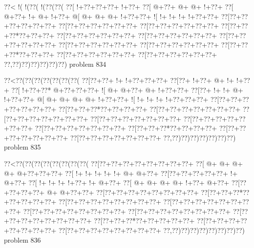 \vbox{\vbox{\goo
\0??<\- !(\- !(\0??(\- !(\0??(\0??(
\0??[\- !+\0??+\0??+\0??+\- !+\0??+
\0??[\- @+\0??+\- @+\- @+\- !+\0??+
\0??[\- @+\0??+\- !+\- @+\- !+\0??+
\- @[\- @+\- @+\- @+\- !+\0??+\0??+
\- ![\- !+\- !+\- !+\- !+\0??+\0??+
\0??[\0??+\0??+\0??+\0??+\0??+\0??+
\0??[\0??+\0??+\0??+\0??+\0??+\0??+
\0??[\0??+\0??+\0??+\0??+\0??+\0??+
\0??[\0??+\0??+\0??*\0??+\0??+\0??+
\0??[\0??+\0??+\0??+\0??+\0??+\0??+
\0??[\0??+\0??+\0??+\0??+\0??+\0??+
\0??[\0??+\0??+\0??+\0??+\0??+\0??+
\0??[\0??+\0??+\0??+\0??+\0??+\0??+
\0??[\0??+\0??+\0??+\0??+\0??+\0??+
\0??[\0??+\0??+\0??*\0??+\0??+\0??+
\0??[\0??+\0??+\0??+\0??+\0??+\0??+
\0??[\0??+\0??+\0??+\0??+\0??+\0??+
\0??,\0??)\0??)\0??)\0??)\0??)\0??)
}
\hfil problem 834\hfil\break
}

\vbox{\vbox{\goo
\0??<\0??(\0??(\0??(\0??(\0??(\0??(\0??(
\0??[\0??+\0??+\- !+\- !+\0??+\0??+\0??+
\0??[\0??+\- !+\0??+\- @+\- !+\- !+\0??+
\0??[\- !+\0??+\0??*\- @+\0??+\0??+\0??+
\- ![\- @+\- @+\0??+\- @+\- !+\0??+\0??+
\0??[\0??+\- !+\- !+\- @+\- !+\0??+\0??+
\- @[\- @+\- @+\- @+\- @+\- !+\0??+\0??+
\- ![\- !+\- !+\- !+\- !+\0??+\0??+\0??+
\0??[\0??+\0??+\0??+\0??+\0??+\0??+\0??+
\0??[\0??+\0??+\0??*\0??+\0??+\0??+\0??+
\0??[\0??+\0??+\0??+\0??+\0??+\0??+\0??+
\0??[\0??+\0??+\0??+\0??+\0??+\0??+\0??+
\0??[\0??+\0??+\0??+\0??+\0??+\0??+\0??+
\0??[\0??+\0??+\0??+\0??+\0??+\0??+\0??+
\0??[\0??+\0??+\0??+\0??+\0??+\0??+\0??+
\0??[\0??+\0??+\0??*\0??+\0??+\0??+\0??+
\0??[\0??+\0??+\0??+\0??+\0??+\0??+\0??+
\0??[\0??+\0??+\0??+\0??+\0??+\0??+\0??+
\0??,\0??)\0??)\0??)\0??)\0??)\0??)\0??)
}
\hfil problem 835\hfil\break
}

\vbox{\vbox{\goo
\0??<\0??(\0??(\0??(\0??(\0??(\0??(\0??(\0??(
\0??[\0??+\0??+\0??+\0??+\0??+\0??+\0??+\0??+
\0??[\- @+\- @+\- @+\- @+\- @+\0??+\0??+\0??+
\0??[\- !+\- !+\- !+\- !+\- !+\- @+\- @+\0??+
\0??[\0??+\0??+\0??+\0??+\0??+\- !+\- @+\0??+
\0??[\- !+\- !+\- !+\- !+\0??+\- !+\- @+\0??+
\0??[\- @+\- @+\- @+\- @+\- !+\0??+\- @+\0??+
\0??[\0??+\0??+\0??+\0??+\- @+\- @+\0??+\0??+
\0??[\0??+\0??+\0??+\0??+\0??+\0??+\0??+\0??+
\0??[\0??+\0??+\0??*\0??+\0??+\0??+\0??+\0??+
\0??[\0??+\0??+\0??+\0??+\0??+\0??+\0??+\0??+
\0??[\0??+\0??+\0??+\0??+\0??+\0??+\0??+\0??+
\0??[\0??+\0??+\0??+\0??+\0??+\0??+\0??+\0??+
\0??[\0??+\0??+\0??+\0??+\0??+\0??+\0??+\0??+
\0??[\0??+\0??+\0??+\0??+\0??+\0??+\0??+\0??+
\0??[\0??+\0??+\0??*\0??+\0??+\0??+\0??+\0??+
\0??[\0??+\0??+\0??+\0??+\0??+\0??+\0??+\0??+
\0??[\0??+\0??+\0??+\0??+\0??+\0??+\0??+\0??+
\0??,\0??)\0??)\0??)\0??)\0??)\0??)\0??)\0??)
}
\hfil problem 836\hfil\break
}

